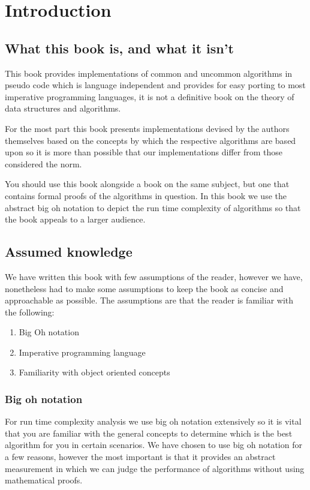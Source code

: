 \chapter{Introduction}

\section{What this book is, and what it isn't}
This book provides implementations of common and uncommon algorithms in pseudo code which is language independent and provides for easy porting to most imperative programming languages, it is not a definitive book on the theory of data structures and algorithms.

For the most part this book presents implementations devised by the authors themselves based on the concepts by which the respective algorithms are based upon so it is more than possible that our implementations differ from those considered the norm.

You should use this book alongside a book on the same subject, but one that contains formal proofs of the algorithms in question. In this book we use the abstract big oh notation to depict the run time complexity of algorithms so that the book appeals to a larger audience.

\section{Assumed knowledge}
We have written this book with few assumptions of the reader, however we have, nonetheless had to make some assumptions to keep the book as concise and approachable as possible. The assumptions are that the reader is familiar with the following:

\begin{enumerate}
\item Big Oh notation
\item Imperative programming language
\item Familiarity with object oriented concepts
\end{enumerate}

\subsection{Big oh notation}
For run time complexity analysis we use big oh notation extensively so it is vital that you are familiar with the general concepts to determine which is the best algorithm for you in certain scenarios. We have chosen to use big oh notation for a few reasons, however the most important is that it provides an abstract measurement in which we can judge the performance of algorithms without using mathematical proofs.

